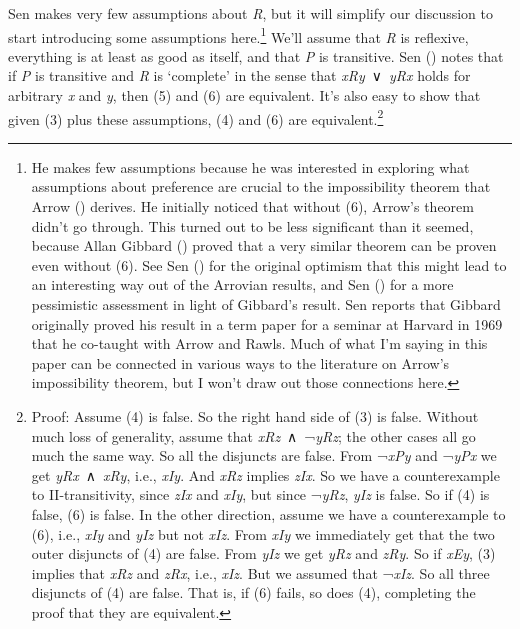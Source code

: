 \documentclass[
  10.5pt,
  twoside]{article}
\begin{document}
Sen makes very few assumptions about \emph{R}, but it will simplify our
discussion to start introducing some assumptions here.\footnote{He makes
  few assumptions because he was interested in exploring what
  assumptions about preference are crucial to the impossibility theorem
  that Arrow () derives. He initially
  noticed that without (6), Arrow's theorem didn't go through. This
  turned out to be less significant than it seemed, because Allan
  Gibbard () proved that a very similar
  theorem can be proven even without (6). See Sen
  () for the original optimism that this
  might lead to an interesting way out of the Arrovian results, and Sen
  () for a more pessimistic
  assessment in light of Gibbard's result. Sen reports that Gibbard
  originally proved his result in a term paper for a seminar at Harvard
  in 1969 that he co-taught with Arrow and Rawls. Much of what I'm
  saying in this paper can be connected in various ways to the
  literature on Arrow's impossibility theorem, but I won't draw out
  those connections here.} We'll assume that \emph{R} is reflexive,
everything is at least as good as itself, and that \emph{P} is
transitive. Sen () notes
that if \emph{P} is transitive and \emph{R} is `complete' in the sense
that \emph{xRy}~∨~\emph{yRx} holds for arbitrary \emph{x} and \emph{y},
then (5) and (6) are equivalent. It's also easy to show that given (3)
plus these assumptions, (4) and (6) are equivalent.\footnote{Proof:
  Assume (4) is false. So the right hand side of (3) is false. Without
  much loss of generality, assume that \emph{xRz}~∧~¬\emph{yRz}; the
  other cases all go much the same way. So all the disjuncts are false.
  From ¬\emph{xPy} and ¬\emph{yPx} we get \emph{yRx}~∧~\emph{xRy}, i.e.,
  \emph{xIy}. And \emph{xRz} implies \emph{zIx}. So we have a
  counterexample to II-transitivity, since \emph{zIx} and \emph{xIy},
  but since ¬\emph{yRz}, \emph{yIz} is false. So if (4) is false, (6) is
  false. In the other direction, assume we have a counterexample to (6),
  i.e., \emph{xIy} and \emph{yIz} but not \emph{xIz}. From \emph{xIy} we
  immediately get that the two outer disjuncts of (4) are false. From
  \emph{yIz} we get \emph{yRz} and \emph{zRy}. So if \emph{xEy}, (3)
  implies that \emph{xRz} and \emph{zRx}, i.e., \emph{xIz}. But we
  assumed that ¬\emph{xIz}. So all three disjuncts of (4) are false.
  That is, if (6) fails, so does (4), completing the proof that they are
  equivalent.}
\end{document}
